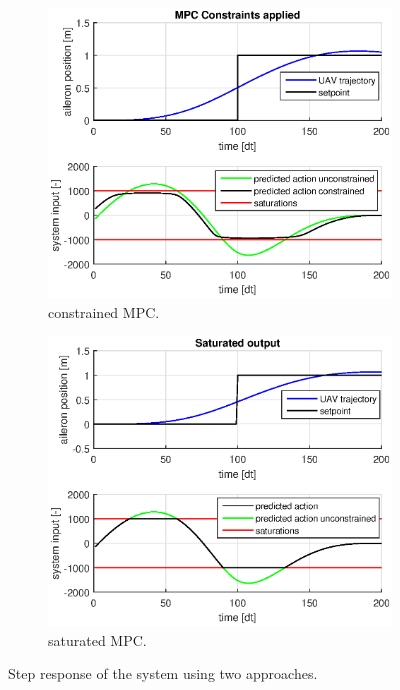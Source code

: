 \documentclass{article}
\begin{document}
\begin{figure}[tbp]
\centering
\begin{subfigure}[b]{0.55\textwidth}
	\includegraphics[width=\textwidth]{fig/step_constrained_2.eps}
	\caption{constrained MPC.}
	\label{fig:mpc_constrained}
\end{subfigure}%
\begin{subfigure}[b]{0.55\textwidth}
	\includegraphics[width=\textwidth]{fig/step_saturated_2.eps}
	\caption{saturated MPC.}
	\label{fig:mpc_saturated}
\end{subfigure}
\caption{Step response of the system using two approaches.}
\label{fig:tricopter_px4flow}
\end{figure}
\end{document}
